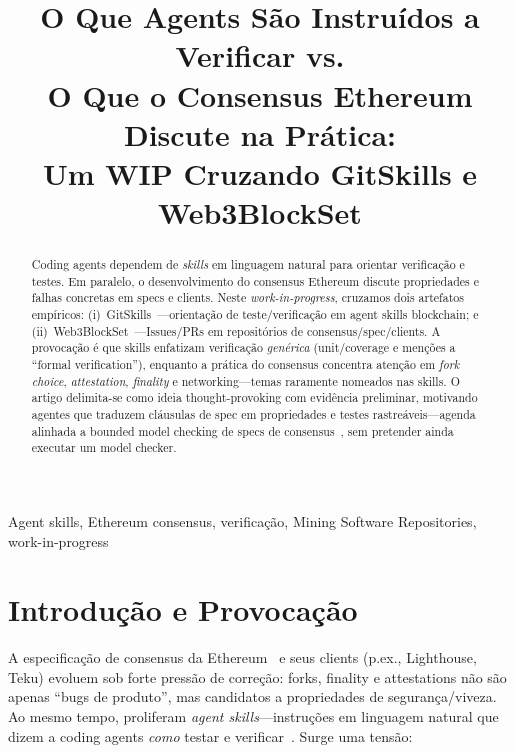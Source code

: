 \documentclass[10pt,conference]{IEEEtran}
\begin{document}
\title{O Que Agents São Instruídos a Verificar vs.\\
O Que o Consensus Ethereum Discute na Prática:\\
Um WIP Cruzando {GitSkills} e {Web3BlockSet}}

\author{
}

\maketitle

\begin{abstract}
Coding agents dependem de \emph{skills} em linguagem natural para orientar verificação e testes. Em paralelo, o desenvolvimento do consensus Ethereum discute propriedades e falhas concretas em specs e clients. Neste \emph{work-in-progress}, cruzamos dois artefatos empíricos: (i)~GitSkills~\cite{gitskills2026}---orientação de teste/verificação em agent skills blockchain; e (ii)~Web3BlockSet~\cite{soares2026web3blockset}---Issues/PRs em repositórios de consensus/spec/clients. A provocação é que skills enfatizam verificação \emph{genérica} (unit/coverage e menções a ``formal verification''), enquanto a prática do consensus concentra atenção em \emph{fork choice}, \emph{attestation}, \emph{finality} e networking---temas raramente nomeados nas skills. O artigo delimita-se como ideia thought-provoking com evidência preliminar, motivando agentes que traduzem cláusulas de spec em propriedades e testes rastreáveis---agenda alinhada a bounded model checking de specs de consensus~\cite{clarke2018bmc,consensusSpecs}, sem pretender ainda executar um model checker.
\end{abstract}

\begin{IEEEkeywords}
Agent skills, Ethereum consensus, verificação, Mining Software Repositories, work-in-progress
\end{IEEEkeywords}

\section{Introdução e Provocação}

A especificação de consensus da Ethereum~\cite{consensusSpecs} e seus clients (p.ex., Lighthouse, Teku) evoluem sob forte pressão de correção: forks, finality e attestations não são apenas ``bugs de produto'', mas candidatos a propriedades de segurança/viveza. Ao mesmo tempo, proliferam \emph{agent skills}---instruções em linguagem natural que dizem a coding agents \emph{como} testar e verificar~\cite{gitskills2026}. Surge uma tensão:
\end{document}
